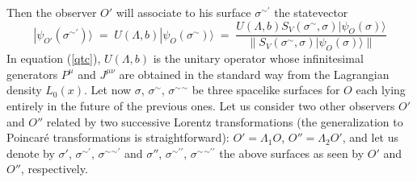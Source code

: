 \documentclass[10pt,a4paper]{article}
\begin{document}
Then the observer $O'$ will associate to his surface
$\sigma{}^{\sim\prime}$ the statevector
\begin{equation} \label{qtc}
|\psi_{O'}(\sigma{}^{\sim\prime})\rangle \; = \; U(\Lambda, b)
|\psi_{O}(\sigma{}^{\sim})\rangle \; = \; \frac{ U(\Lambda, b)
S_{V}(\sigma{}^{\sim}, \sigma) |\psi_{O}(\sigma)\rangle}{\|
S_{V}(\sigma{}^{\sim}, \sigma) |\psi_{O}(\sigma)\rangle\|}
\end{equation}
In equation (\ref{qtc}), $U(\Lambda, b)$ is the unitary operator
whose infinitesimal generators $P^{\mu}$ and $J^{\mu\nu}$ are
obtained in the standard way from the Lagrangian density
$L_{0}(x)$. Let now $\sigma$, $\sigma{}^{\sim}$,
$\sigma{}^{\sim}{}^{\sim}$ be three spacelike surfaces for $O$
each lying entirely in the future of the previous ones. Let us
consider two other observers $O'$ and $O''$ related by two
successive Lorentz transformations (the generalization to
Poincar\'e transformations is straightforward): $O' = \Lambda_{1}
O$, $O'' = \Lambda_{2} O'$, and let us denote by $\sigma'$,
$\sigma{}^{\sim\prime}$, $\sigma{}^{\sim}{}^{\sim\prime}$ and
$\sigma''$, $\sigma{}^{\sim\prime\prime}$,
$\sigma{}^{\sim}{}^{\sim\prime\prime}$ the above surfaces as seen
by $O'$ and $O''$, respectively.
\end{document}
